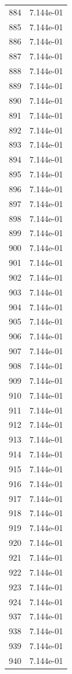 \documentclass[12pt]{article}
\begin{document}
\begin{longtable}{@{}cc@{}}
884 & 7.144e-01 \\
885 & 7.144e-01 \\
886 & 7.144e-01 \\
887 & 7.144e-01 \\
888 & 7.144e-01 \\
889 & 7.144e-01 \\
890 & 7.144e-01 \\
891 & 7.144e-01 \\
892 & 7.144e-01 \\
893 & 7.144e-01 \\
894 & 7.144e-01 \\
895 & 7.144e-01 \\
896 & 7.144e-01 \\
897 & 7.144e-01 \\
898 & 7.144e-01 \\
899 & 7.144e-01 \\
900 & 7.144e-01 \\
901 & 7.144e-01 \\
902 & 7.144e-01 \\
903 & 7.144e-01 \\
904 & 7.144e-01 \\
905 & 7.144e-01 \\
906 & 7.144e-01 \\
907 & 7.144e-01 \\
908 & 7.144e-01 \\
909 & 7.144e-01 \\
910 & 7.144e-01 \\
911 & 7.144e-01 \\
912 & 7.144e-01 \\
913 & 7.144e-01 \\
914 & 7.144e-01 \\
915 & 7.144e-01 \\
916 & 7.144e-01 \\
917 & 7.144e-01 \\
918 & 7.144e-01 \\
919 & 7.144e-01 \\
920 & 7.144e-01 \\
921 & 7.144e-01 \\
922 & 7.144e-01 \\
923 & 7.144e-01 \\
924 & 7.144e-01 \\
937 & 7.144e-01 \\
938 & 7.144e-01 \\
939 & 7.144e-01 \\
940 & 7.144e-01 \\

\end{longtable}
\end{document}
